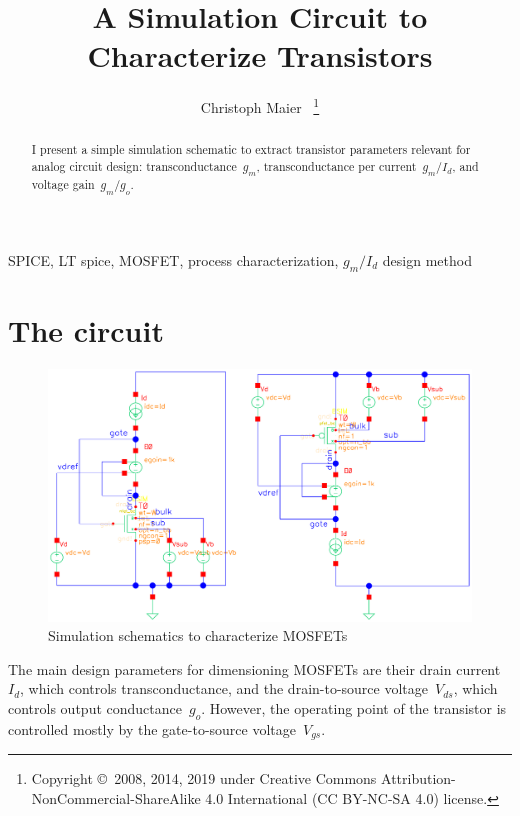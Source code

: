 \documentclass[journal]{IEEEtran}
\begin{document}
\title{A Simulation Circuit to Characterize Transistors}
\author{Christoph Maier~%
\thanks{Copyright \copyright\ 2008, 2014, 2019 under Creative Commons
Attribution-NonCommercial-ShareAlike 4.0 International (CC BY-NC-SA 4.0) license.}}%
\maketitle
\begin{abstract}\boldmath
I present a simple simulation schematic to extract transistor parameters relevant for analog circuit design:
transconductance~$g_m$, transconductance per current~$g_m/I_d$, and voltage gain~$g_m/g_o$.
\end{abstract}


\begin{IEEEkeywords}
SPICE, LT spice, MOSFET, process characterization, $g_m/I_d$ design method
\end{IEEEkeywords}

\IEEEpeerreviewmaketitle
\section{The circuit}
\begin{figure}[h]
\centering
\includegraphics[width=1.0\columnwidth]{figures/mostest_fb.pdf}
\caption{Simulation schematics to characterize MOSFETs}
\label{fig:schematics}
\end{figure}
%
The main design parameters for dimensioning MOSFETs are their drain current~$I_d$, 
which controls transconductance, 
and the drain-to-source voltage~$V_{ds}$, which controls output conductance~$g_o$.
However, the operating point of the transistor is controlled mostly by the gate-to-source voltage~$V_{gs}$.
\end{document}
